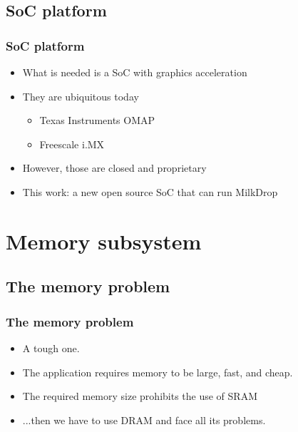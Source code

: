 \documentclass{beamer}
\begin{document}
\subsection{SoC platform}
\frame
{
  \frametitle{SoC platform}

  \begin{itemize}
  \item What is needed is a SoC with graphics acceleration
  \item They are ubiquitous today
  \begin{itemize}
  \item Texas Instruments OMAP
  \item Freescale i.MX
  \end{itemize}
  \item However, those are closed and proprietary
  \item This work: a new open source SoC that can run MilkDrop
  \end{itemize}
}


\section{Memory subsystem}
\subsection{The memory problem}
\frame
{
  \frametitle{The memory problem}

  \begin{itemize}
  \item A tough one.
  \item The application requires memory to be large, fast, and cheap.
  \item The required memory size prohibits the use of SRAM
  \item ...then we have to use DRAM and face all its problems.
  \end{itemize}
}
\end{document}
